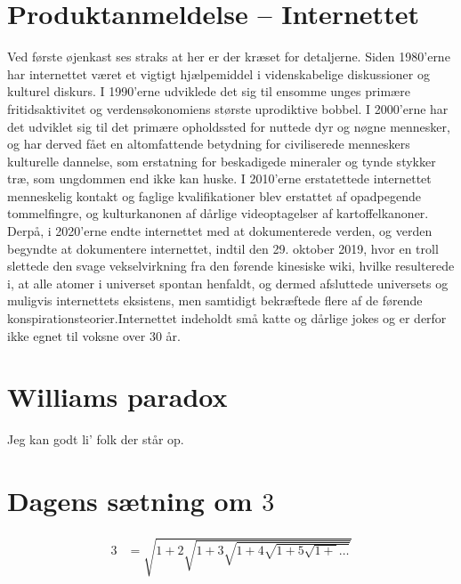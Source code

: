 

\begin{minipage}[b]{0.95\linewidth}
\begin{minipage}[t]{0.47\textwidth}
\vspace{3mm}
\section*{Produktanmeldelse -- Internettet}
Ved første øjenkast ses straks at her er der kræset for detaljerne. Siden 1980'erne har internettet været et vigtigt hjælpemiddel i videnskabelige diskussioner og kulturel diskurs. I 1990'erne udviklede det sig til ensomme unges primære fritidsaktivitet og verdensøkonomiens største uprodiktive bobbel. I 2000'erne har det  udviklet sig til det primære opholdssted for nuttede dyr og nøgne mennesker, og har derved fået en altomfattende betydning for civiliserede menneskers kulturelle dannelse, som erstatning for beskadigede mineraler og tynde stykker træ, som ungdommen end ikke kan huske. I 2010'erne erstatettede internettet menneskelig kontakt og faglige kvalifikationer blev erstattet af opadpegende tommelfingre, og kulturkanonen af dårlige videoptagelser af kartoffelkanoner. Derpå, i 2020'erne endte internettet med at dokumenterede verden, og verden begyndte at dokumentere internettet, indtil den 29. oktober 2019, hvor en troll slettede den svage vekselvirkning fra den førende kinesiske wiki, hvilke resulterede i, at alle atomer i universet spontan henfaldt, og dermed afsluttede universets og muligvis internettets eksistens, men samtidigt bekræftede flere af de førende konspirationsteorier.Internettet indeholdt små katte og dårlige jokes og er derfor ikke egnet til voksne over 30 år.

\vspace{1mm}
\section*{Williams paradox}
Jeg kan godt li' folk der står op.

\vspace{1mm}
\section*{Dagens sætning om $3$}
\begin{align*}
3 &= \sqrt{1+2\sqrt{1+3\sqrt{1+4\sqrt{1+5\sqrt{1+}\dots}}}}
\end{align*}

\vspace{1mm}

\end{minipage}
\end{minipage}
